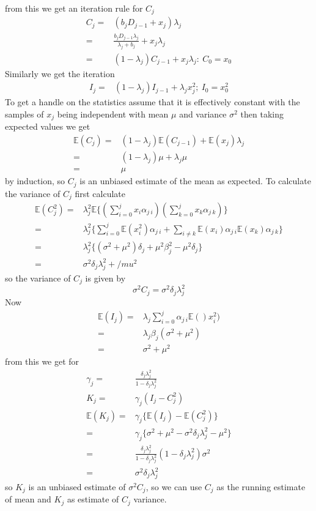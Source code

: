 \documentclass[a4paper,oneside,english]{book}
\numberwithin{equation}{section}
\numberwithin{figure}{section}
\begin{document}
from this we get an iteration rule for $C_j$
\begin{align}
C_j=&(b_j D_{j-1} + x_j)\lambda_j \\
=& \frac{b_j D_{j-1} \lambda_j}{\lambda_j +b_j} +x_j \lambda_j \\
=&(1-\lambda_j)C_{j-1} + x_j \lambda_j : \: C_0=x_0 \label{eq:c_j_iter}
\end{align}
Similarly we get the iteration
\begin{align}
I_j=& (1-\lambda_j)I_{j-1}+\lambda_j x_j^2; \: I_0=x_0^2
\end{align}
To get a handle on the statistics assume that it is effectively constant with the samples of $x_j$ being independent with mean $\mu$ and variance $\sigma^2 $ then taking expected values we get
\begin{align}
\mathbb{E}(C_j)=& (1-\lambda_j)\mathbb{E}(C_{j-1})+\mathbb{E}(x_j)\lambda_j\\
=& (1-\lambda_j)\mu +\lambda_j \mu\\
=&\mu
\end{align}
by induction, so $C_j$ is an unbiased estimate of the mean as expected. 
To calculate the variance of $C_j$ first calculate
\begin{align}
\mathbb{E}(C_j^2)=& \lambda_j ^2  \mathbb{E}\{ (\sum_{i=0}^{j} x_i \alpha_{j\:i} )  (\sum_{k=0}^{j} x_k \alpha_{j\:k} )\}\\
=&\lambda_j ^2  \{\sum_{i=0}^j \mathbb{E}(x_i^2)\alpha_{j\:i}+\sum_{i \ne k} \mathbb{E}(x_i)\alpha_{j\:i}\mathbb{E}(x_k)\alpha_{j\:k}\}\\
=&\lambda_j ^2  \{  (\sigma^2+\mu^2)\delta_j +\mu^2 \beta_j^2 -\mu^2 \delta_j  \}\\
=&\sigma^2 \delta_j  \lambda_j ^2 + /mu^2
\end{align}
so the variance of $C_j$ is given by
\begin{equation}\label{eq:C_j_variance}
\sigma^2 C_j = \sigma^2 \delta_j  \lambda_j ^2 
\end{equation}
Now
\begin{align}
\mathbb{E}(I_j)=&\lambda_j \sum_{i=0}^j \alpha_{j\:i} \mathbb{E}()x_i^2)\\
=&\lambda_j \beta_j (\sigma^2 +\mu^2)\\
=& \sigma^2 +\mu^2
\end{align}
from this we get for
\begin{align}\label{key}
\gamma_j=& \frac{\delta_j \lambda_j^2}{1-\delta_j \lambda_j^2}\\
K_j =& \gamma_j(I_j-C_j^2)\\
\mathbb{E}(K_j)=&\gamma_j \{ \mathbb{E}(I_j)- \mathbb{E}(C_j^2)  \} \\
=& \gamma_j \{ \sigma^2 +\mu^2 -  \sigma^2 \delta_j  \lambda_j ^2 -\mu^2  \}\\
=&  \frac{\delta_j \lambda_j^2}{1-\delta_j \lambda_j^2} (1-\delta_j \lambda_j^2)\sigma^2\\
=&  \sigma^2 \delta_j  \lambda_j ^2 
\end{align}
so  $K_j$ is an unbiased estimate of $ \sigma^2 C_j  $, so we can use $C_j$ as the running estimate of  mean and $K_j$ as  estimate of $C_j$ variance.
\end{document}
